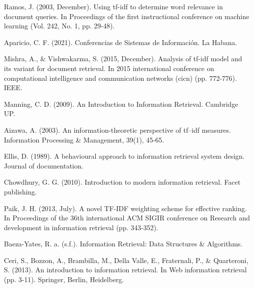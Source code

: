 \documentclass{llncs}
\begin{document}
\tableofcontents
\clearpage














%
%
\begin{thebibliography}{}
%

Ramos, J. (2003, December). Using tf-idf to determine word relevance in
document queries. In Proceedings of the first instructional conference on
machine learning (Vol. 242, No. 1, pp. 29-48).

Aparicio, C. F. (2021). Conferencias de Sistemas de Información. La Habana.

Mishra, A., \& Vishwakarma, S. (2015, December). Analysis of tf-idf model and
its variant for document retrieval. In 2015 international conference on
computational intelligence and communication networks (cicn) (pp. 772-776). IEEE.

Manning, C. D. (2009). An Introduction to Information Retrieval. Cambridge UP.

Aizawa, A. (2003). An information-theoretic perspective of tf–idf measures.
Information Processing \& Management, 39(1), 45-65.

Ellis, D. (1989). A behavioural approach to information retrieval system
design. Journal of documentation.

Chowdhury, G. G. (2010). Introduction to modern information retrieval.
Facet publishing.

Paik, J. H. (2013, July). A novel TF-IDF weighting scheme for effective
ranking. In Proceedings of the 36th international ACM SIGIR conference on
Research and development in information retrieval (pp. 343-352).

Baeza-Yates, R. a. (s.f.). Information Retrieval: Data Structures \&
Algorithms.

Ceri, S., Bozzon, A., Brambilla, M., Della Valle, E., Fraternali, P., \&
Quarteroni, S. (2013). An introduction to information retrieval. In Web
information retrieval (pp. 3-11). Springer, Berlin, Heidelberg.

\end{thebibliography}
\clearpage
{} %
\renewcommand{\indexname}{Subject Index}

\end{document}
